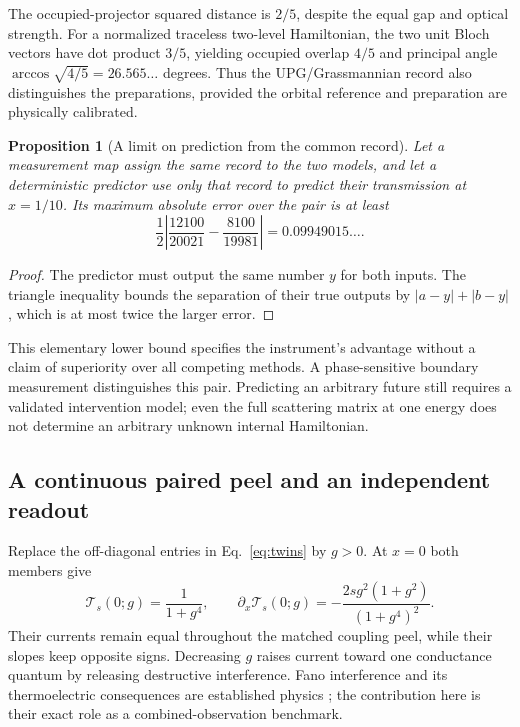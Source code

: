 \documentclass[11pt]{article}
\newtheorem{proposition}{Proposition}
\begin{document}
The occupied-projector squared distance is $2/5$, despite the equal gap and optical strength. For a normalized traceless two-level Hamiltonian, the two unit Bloch vectors have dot product $3/5$, yielding occupied overlap $4/5$ and principal angle $\arccos\sqrt{4/5}=26.565\ldots$ degrees. Thus the UPG/Grassmannian record also distinguishes the preparations, provided the orbital reference and preparation are physically calibrated.

\begin{proposition}[A limit on prediction from the common record]
Let a measurement map assign the same record to the two models, and let a deterministic predictor use only that record to predict their transmission at $x=1/10$. Its maximum absolute error over the pair is at least
\begin{equation}
\frac12\left|\frac{12100}{20021}-\frac{8100}{19981}\right|
=0.09949015\ldots.
\end{equation}
\end{proposition}
\begin{proof}
The predictor must output the same number $y$ for both inputs. The triangle inequality bounds the separation of their true outputs by $|a-y|+|b-y|$, which is at most twice the larger error.\end{proof}
This elementary lower bound specifies the instrument's advantage without a claim of superiority over all competing methods. A phase-sensitive boundary measurement distinguishes this pair. Predicting an arbitrary future still requires a validated intervention model; even the full scattering matrix at one energy does not determine an arbitrary unknown internal Hamiltonian.

\subsection{A continuous paired peel and an independent readout}
Replace the off-diagonal entries in Eq.~\eqref{eq:twins} by $g>0$. At $x=0$ both members give
\begin{equation}
\mathcal T_s(0;g)=\frac1{1+g^4},\qquad
\partial_x\mathcal T_s(0;g)=
-\frac{2s g^2(1+g^2)}{(1+g^4)^2}.
\end{equation}
Their currents remain equal throughout the matched coupling peel, while their slopes keep opposite signs. Decreasing $g$ raises current toward one conductance quantum by releasing destructive interference. Fano interference and its thermoelectric consequences are established physics \cite{fano}; the contribution here is their exact role as a combined-observation benchmark.
\end{document}
